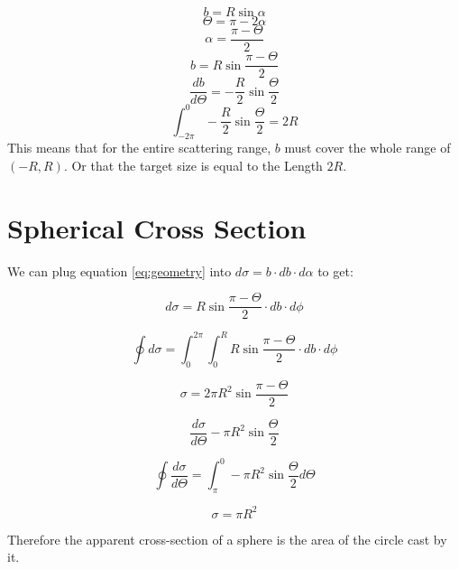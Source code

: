 \documentclass[12pt]{article}
\begin{document}
\begin{equation}
b=R{\sin{\alpha}}
\end{equation}
\begin{equation}
  \Theta=\pi-2\alpha
\end{equation}
\begin{equation}
  \alpha=\frac{\pi-\Theta}{2}
\end{equation}
\begin{equation}\label{eq:geometry}
  b=R\sin{\frac{\pi-\Theta}{2}}
\end{equation}
\begin{equation}
  \frac{{d}{b}}{{d}{\Theta}}=-\frac{R}{2}\sin{\frac{\Theta}{2}}
\end{equation}
\begin{equation}
  \int_{-2\pi}^{0}-\frac{R}{2}\sin{\frac{\Theta}{2}}=2R
\end{equation}
This means that for the entire scattering range, $b$ must cover the whole range of $(-R,R)$. Or that the target size is equal to the Length $2R$.

\section{Spherical Cross Section}
We can plug equation \eqref{eq:geometry} into ${d}\sigma=b\cdot{d}b\cdot{d}\alpha$ to get:

\begin{equation}
  {d}\sigma=R\sin{\frac{\pi-\Theta}{2}}\cdot{d}b\cdot{d}\phi
\end{equation}

\begin{equation}
  \oint{d}\sigma=\int_0^{2\pi}\int_0^R R\sin{\frac{\pi-\Theta}{2}}\cdot{d}b\cdot{d}\phi
\end{equation}

\begin{equation}
  \sigma=2\pi R^2\sin{\frac{\pi-\Theta}{2}}
\end{equation}

\begin{equation}
  \frac{d\sigma}{d\Theta}-\pi{R^2}\sin{\frac{\Theta}{2}}
\end{equation}

\begin{equation}
  \oint\frac{d\sigma}{d\Theta}=\int_\pi^0-\pi{R^2}\sin{\frac{\Theta}{2}}d\Theta
\end{equation}

\begin{equation}
  \sigma=\pi R^2
\end{equation}

Therefore the apparent cross-section of a sphere is the area of the circle cast by it.
\end{document}
